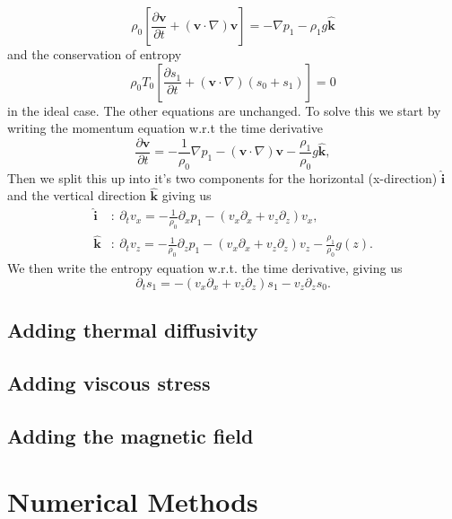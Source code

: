 \begin{equation}\label{eq:momentum_ideal}
    \rho_0\left[\frac{\partial\mathbf{v}}{\partial t}+(\mathbf{v}\cdot\nabla)\mathbf{v}\right]=-\nabla p_1 - \rho_1g\mathbf{\hat{k}}
\end{equation}
and the conservation of entropy
\begin{equation}\label{eq:entropy_ideal}
    \rho_0 T_0 \left[\frac{\partial s_1}{\partial t} + (\mathbf{v}\cdot \nabla)(s_0+s_1) \right]
    = 0
\end{equation}
in the ideal case. The other equations are unchanged. To solve this we start by writing the momentum equation w.r.t the time derivative
\begin{equation}\label{eq:momentum_wrt_t}
    \frac{\partial\mathbf{v}}{\partial t} = -\frac{1}{\rho_0}\nabla p_1 - (\mathbf{v}\cdot\nabla)\mathbf{v} - \frac{\rho_1}{\rho_0}g\mathbf{\hat{k}},
\end{equation}
Then we split this up into it's two components for the horizontal (x-direction) $\mathbf{\hat{i}}$ and the vertical direction $\mathbf{\hat{k}}$ giving us 
\begin{align}
    \mathbf{\hat{i}}&:\ \partial_t v_x = -\frac{1}{\rho_0}\partial_x p_1 - (v_x\partial_x + v_z\partial_z)v_x, \label{eq:momentum_wrt_i}\\
    \mathbf{\hat{k}}&:\ \partial_t v_z = -\frac{1}{\rho_0}\partial_z p_1 - (v_x\partial_x + v_z\partial_z)v_z - \frac{\rho_1}{\rho_0}g(z). \label{eq:momentum_wrt_k}
\end{align}
We then write the entropy equation w.r.t. the time derivative, giving us
\begin{equation}
    \partial_t s_1 = - (v_x\partial_x+v_z\partial_z)s_1 - v_z\partial_z s_0.
\end{equation}

\subsection{Adding thermal diffusivity}
\subsection{Adding viscous stress}
\subsection{Adding the magnetic field}

\section{Numerical Methods}
